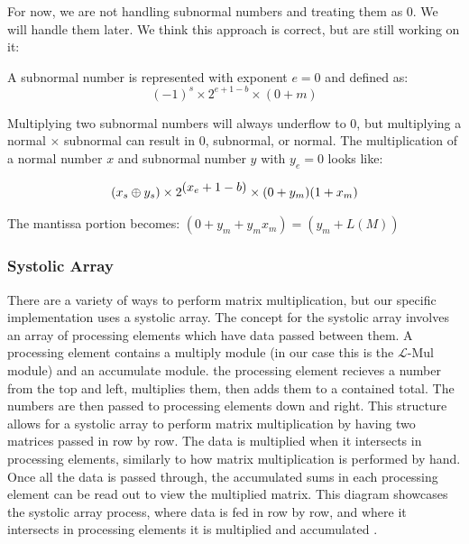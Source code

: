 \documentclass[12pt,letterpaper]{article}
\newcommand{\lmul}{$\mathcal{L}$-Mul\xspace}
\begin{document}
For now, we are not handling subnormal numbers and treating them as 0. We will handle them later. We think this approach is correct, but are still working on it:

A subnormal number is represented with exponent $e=0$ and defined as:
$$ (-1)^s \times 2^{e+1-b} \times (0+m) $$

Multiplying two subnormal numbers will always underflow to 0, but multiplying a normal $\times$ subnormal can result in 0, subnormal, or normal. The multiplication of a normal number $x$ and subnormal number $y$ with $y_e=0$ looks like:

$$
(x_s \oplus y_s) \times 2^{\textstyle (x_e+1-b)} \times (0+y_m)(1+x_m) \\
$$

The mantissa portion becomes: $(0 + y_m + y_m x_m) = (y_m + L(M))$

\subsubsection*{Systolic Array}
There are a variety of ways to perform matrix multiplication, but our specific implementation uses a systolic array.  The concept for the systolic array involves an array of processing elements which have data passed between them.  A processing element contains a multiply module (in our case this is the \lmul module) and an accumulate module.  the processing element recieves a number from the top and left, multiplies them, then adds them to a contained total.  The numbers are then passed to processing elements down and right.  This structure allows for a systolic array to perform matrix multiplication by having two matrices passed in row by row.  The data is multiplied when it intersects in processing elements, similarly to how matrix multiplication is performed by hand.  Once all the data is passed through, the accumulated sums in each processing element can be read out to view the multiplied matrix.  This diagram showcases the systolic array process, where data is fed in row by row, and where it intersects in processing elements it is multiplied and accumulated \citep{5x5systolic}. 
\end{document}
